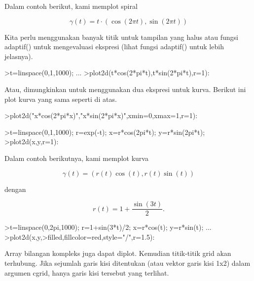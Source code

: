 \documentclass[a4paper,10pt]{article}
\begin{document}
\begin{eulernotebook}
\begin{eulercomment}
\begin{eulercomment}
\begin{eulercomment}
\begin{eulercomment}
\begin{eulercomment}
\begin{eulercomment}
\begin{eulercomment}
\begin{eulercomment}
\begin{eulercomment}
Dalam contoh berikut, kami memplot spiral

\end{eulercomment}
\begin{eulerformula}
\[
\gamma(t) = t \cdot (\cos(2\pi t),\sin(2\pi t))
\]
\end{eulerformula}
\begin{eulercomment}
Kita perlu menggunakan banyak titik untuk tampilan yang halus atau
fungsi adaptif() untuk mengevaluasi ekspresi (lihat fungsi adaptif()
untuk lebih jelasnya).
\end{eulercomment}
\begin{eulerprompt}
>t=linspace(0,1,1000); ...
>plot2d(t*cos(2*pi*t),t*sin(2*pi*t),r=1):
\end{eulerprompt}
\begin{eulercomment}
Atau, dimungkinkan untuk menggunakan dua ekspresi untuk kurva. Berikut
ini plot kurva yang sama seperti di atas.
\end{eulercomment}
\begin{eulerprompt}
>plot2d("x*cos(2*pi*x)","x*sin(2*pi*x)",xmin=0,xmax=1,r=1):
\end{eulerprompt}
\begin{eulerprompt}
>t=linspace(0,1,1000); r=exp(-t); x=r*cos(2pi*t); y=r*sin(2pi*t);
>plot2d(x,y,r=1):
\end{eulerprompt}
\begin{eulercomment}
Dalam contoh berikutnya, kami memplot kurva

\end{eulercomment}
\begin{eulerformula}
\[
\gamma(t) = (r(t) \cos(t), r(t) \sin(t))
\]
\end{eulerformula}
\begin{eulercomment}
dengan

\end{eulercomment}
\begin{eulerformula}
\[
r(t) = 1 + \dfrac{\sin(3t)}{2}.
\]
\end{eulerformula}
\begin{eulerprompt}
>t=linspace(0,2pi,1000); r=1+sin(3*t)/2; x=r*cos(t); y=r*sin(t); ...
>plot2d(x,y,>filled,fillcolor=red,style="/",r=1.5):
\end{eulerprompt}
\begin{eulercomment}
Array bilangan kompleks juga dapat diplot. Kemudian titik-titik grid
akan terhubung. Jika sejumlah garis kisi ditentukan (atau vektor garis
kisi 1x2) dalam argumen cgrid, hanya garis kisi tersebut yang
terlihat.


\end{eulercomment}
\end{eulercomment}
\end{eulercomment}
\end{eulercomment}
\end{eulercomment}
\end{eulercomment}
\end{eulercomment}
\end{eulercomment}
\end{eulercomment}
\end{eulernotebook}
\end{document}
